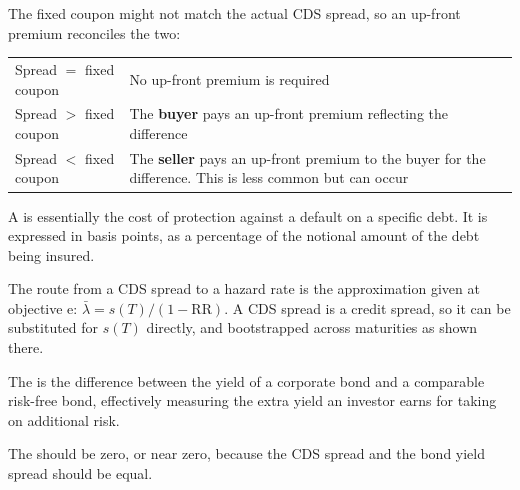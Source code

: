 The fixed coupon might not match the actual CDS spread, so an up-front premium
reconciles the two:

\begin{center}
\footnotesize
\begin{tabular}{L{5.2cm} L{9.3cm}}
\toprule
{} &  \\
\midrule
Spread $=$ fixed coupon & No up-front premium is required \\
Spread $>$ fixed coupon & The \textbf{buyer} pays an up-front premium reflecting
the difference \\
Spread $<$ fixed coupon & The \textbf{seller} pays an up-front premium to the
buyer for the difference. This is less common but can occur \\
\bottomrule
\end{tabular}
\end{center}


A  is essentially the cost of protection against a default on a
specific debt. It is expressed in basis points, as a percentage of the notional
amount of the debt being insured.

The route from a CDS spread to a hazard rate is the approximation given at
objective e: $\bar{\lambda} = s(T) / (1-\mathrm{RR})$. A CDS spread is a credit
spread, so it can be substituted for $s(T)$ directly, and bootstrapped across
maturities as shown there.


\begin{crdefbox}
The  is the difference between the yield of a corporate
bond and a comparable risk-free bond, effectively measuring the extra yield an
investor earns for taking on additional risk.

\smallskip
The  should be zero, or near zero, because the CDS spread
and the bond yield spread should be equal.
\end{crdefbox}

